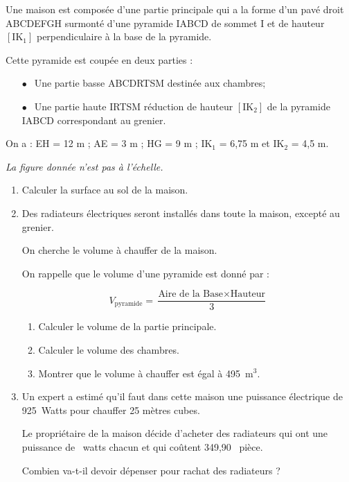 \documentclass[10pt]{article}
\newcommand{\euro}{\eurologo{}}
\begin{document}
\medskip

Une maison est composée d'une partie principale qui a la forme d'un pavé droit ABCDEFGH surmonté d'une pyramide IABCD de sommet I et de hauteur $\left[\text{IK}_1\right]$
perpendiculaire à la base de la pyramide.

Cette pyramide est coupée en deux parties :

\setlength\parindent{8mm}
\begin{itemize}
\item[$\bullet~~$] Une partie basse ABCDRTSM destinée aux chambres;
\item[$\bullet~~$] Une partie haute IRTSM réduction de hauteur $\left[\text{IK}_2\right]$ de la pyramide IABCD correspondant au grenier.
\end{itemize}
\setlength\parindent{0mm}

On a : EH = 12 m ; AE = 3 m ; HG = 9 m ; IK$_1$ = 6,75 m et IK$_2$ = 4,5 m.

\emph{La figure donnée n'est pas à l'échelle.}

\medskip

\begin{enumerate}
\item Calculer la surface au sol de la maison.
\item Des radiateurs électriques seront installés dans toute la maison, excepté au
grenier.

On cherche le volume à chauffer de la maison.

On rappelle que le volume d'une pyramide est donné par :

\[V_{\text{pyramide}} = \dfrac{\text{Aire de la Base} \times \text{Hauteur}}{3}\]

	\begin{enumerate}
		\item Calculer le volume de la partie principale.
		\item Calculer le volume des chambres.
		\item Montrer que le volume à chauffer est égal à 495~m$^3$.
	\end{enumerate}
\item  Un expert a estimé qu'il faut dans cette maison une puissance électrique de
925~Watts pour chauffer 25 mètres cubes.
	
Le propriétaire de la maison décide d'acheter des radiateurs qui ont une puissance
de ~watts chacun et qui coûtent 349,90~\euro{} pièce.
	
Combien va-t-il devoir dépenser pour rachat des radiateurs ?
\end{enumerate} 
\end{document}
